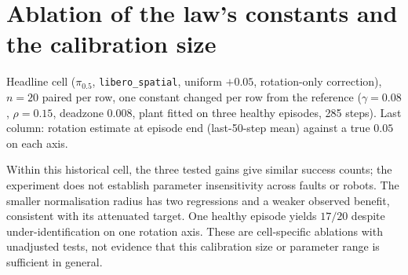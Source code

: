 \documentclass{article}
\newcommand{\code}[1]{\texttt{\small #1}}
\begin{document}
\section{Ablation of the law's constants and the calibration size}
\label{app:abl}
Headline cell ($\pi_{0.5}$, \code{libero\_spatial}, uniform $+0.05$, rotation-only
correction), $n=20$ paired per row, one constant changed per row from the reference
($\gamma=0.08$, $\rho=0.15$, deadzone $0.008$, plant fitted on three healthy episodes,
285 steps). Last column: rotation estimate at episode end (last-50-step mean) against a
true $0.05$ on each axis.

\begin{center}\small
{}

\end{center}

Within this historical cell, the three tested gains give similar success counts; the
experiment does not establish parameter insensitivity across faults or robots. The smaller
normalisation radius has two regressions and a weaker observed benefit, consistent with
its attenuated target. One healthy episode yields $17/20$ despite under-identification on
one rotation axis. These are cell-specific ablations with unadjusted tests, not evidence
that this calibration size or parameter range is sufficient in general.
\end{document}
